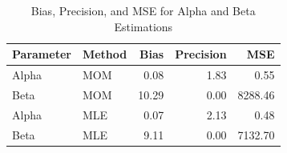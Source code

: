 \documentclass{article}\usepackage[]{graphicx}\usepackage[]{xcolor}
\begin{document}
\begin{table}[ht]
\centering
\begin{tabular}{llrrr}
  \hline
Parameter & Method & Bias & Precision & MSE \\ 
  \hline
Alpha & MOM & 0.08 & 1.83 & 0.55 \\ 
  Beta & MOM & 10.29 & 0.00 & 8288.46 \\ 
  Alpha & MLE & 0.07 & 2.13 & 0.48 \\ 
  Beta & MLE & 9.11 & 0.00 & 7132.70 \\ 
   \hline
\end{tabular}
\caption{Bias, Precision, and MSE for Alpha and Beta Estimations} 
\end{table}
\end{document}
